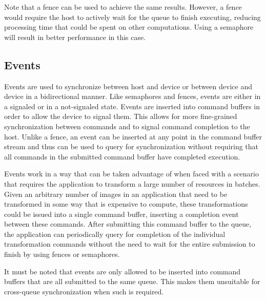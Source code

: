       Note that a fence can be used to achieve the same results.
      However, a fence would require the \gls{host} to actively wait for the queue to finish executing, reducing processing time that could be spent on other computations.
      Using a semaphore will result in better performance in this case.

    \subsection{Events}
    \label{sub:Events}

      Events are used to synchronize between \gls{host} and device or between device and device in a bidirectional manner.
      Like semaphores and fences, events are either in a signaled or in a not-signaled state.
      Events are inserted into command buffers in order to allow the device to signal them.
      This allows for more fine-grained synchronization between commands and to signal command completion to the \gls{host}.
      Unlike a fence, an event can be inserted at any point in the command buffer stream and thus can be used to query for synchronization without requiring that all commands in the submitted command buffer have completed execution.

      Events work in a way that can be taken advantage of when faced with a scenario that requires the \gls{application} to transform a large number of resources in batches.
      Given an arbitrary number of images in an \gls{application} that need to be transformed in some way that is expensive to compute, these transformations could be issued into a single command buffer, inserting a completion event between these commands.
      After submitting this command buffer to the queue, the \gls{application} can periodically query for completion of the individual transformation commands without the need to wait for the entire submission to finish by using fences or semaphores.

      It must be noted that events are only allowed to be inserted into command buffers that are all submitted to the same queue.
      This makes them unsuitable for cross-queue synchronization when such is required.

